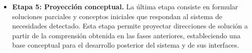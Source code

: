 \begin{itemize}
    \item \textbf{Etapa 5: Proyección conceptual.}
    La última etapa consiste en formular soluciones parciales y conceptos iniciales que respondan al sistema de necesidades detectado. Esta etapa permite proyectar direcciones de solución a partir de la comprensión obtenida en las fases anteriores, estableciendo una base conceptual para el desarrollo posterior del sistema y de sus interfaces.
\end{itemize}
